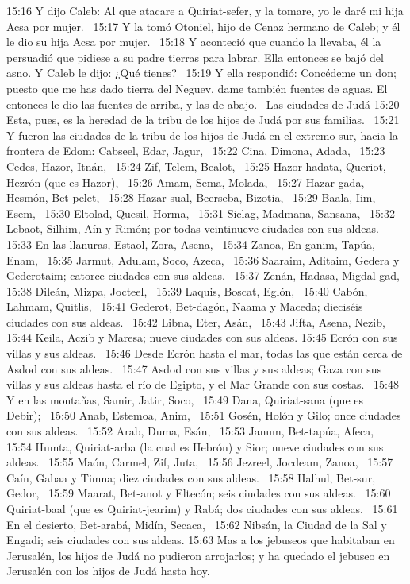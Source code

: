 15:16 Y dijo Caleb: Al que atacare a Quiriat-sefer, y la tomare, yo le daré mi hija Acsa por mujer.  
15:17 Y la tomó Otoniel, hijo de Cenaz hermano de Caleb; y él le dio su hija Acsa por mujer.  
15:18 Y aconteció que cuando la llevaba, él la persuadió que pidiese a su padre tierras para labrar. Ella entonces se bajó del asno. Y Caleb le dijo: ¿Qué tienes?  
15:19 Y ella respondió: Concédeme un don; puesto que me has dado tierra del Neguev, dame también fuentes de aguas. El entonces le dio las fuentes de arriba, y las de abajo.  
Las ciudades de Judá 
15:20 Esta, pues, es la heredad de la tribu de los hijos de Judá por sus familias.  
15:21 Y fueron las ciudades de la tribu de los hijos de Judá en el extremo sur, hacia la frontera de Edom: Cabseel, Edar, Jagur,  
15:22 Cina, Dimona, Adada,  
15:23 Cedes, Hazor, Itnán,  
15:24 Zif, Telem, Bealot,  
15:25 Hazor-hadata, Queriot, Hezrón (que es Hazor),  
15:26 Amam, Sema, Molada,  
15:27 Hazar-gada, Hesmón, Bet-pelet,  
15:28 Hazar-sual, Beerseba, Bizotia,  
15:29 Baala, Iim, Esem,  
15:30 Eltolad, Quesil, Horma,  
15:31 Siclag, Madmana, Sansana,  
15:32 Lebaot, Silhim, Aín y Rimón; por todas veintinueve ciudades con sus aldeas.  
15:33 En las llanuras, Estaol, Zora, Asena,  
15:34 Zanoa, En-ganim, Tapúa, Enam,  
15:35 Jarmut, Adulam, Soco, Azeca,  
15:36 Saaraim, Aditaim, Gedera y Gederotaim; catorce ciudades con sus aldeas.  
15:37 Zenán, Hadasa, Migdal-gad,  
15:38 Dileán, Mizpa, Jocteel,  
15:39 Laquis, Boscat, Eglón,  
15:40 Cabón, Lahmam, Quitlis,  
15:41 Gederot, Bet-dagón, Naama y Maceda; dieciséis ciudades con sus aldeas.  
15:42 Libna, Eter, Asán,  
15:43 Jifta, Asena, Nezib,  
15:44 Keila, Aczib y Maresa; nueve ciudades con sus aldeas. 
15:45 Ecrón con sus villas y sus aldeas.  
15:46 Desde Ecrón hasta el mar, todas las que están cerca de Asdod con sus aldeas.  
15:47 Asdod con sus villas y sus aldeas; Gaza con sus villas y sus aldeas hasta el río de Egipto, y el Mar Grande con sus costas.  
15:48 Y en las montañas, Samir, Jatir, Soco,  
15:49 Dana, Quiriat-sana (que es Debir);  
15:50 Anab, Estemoa, Anim,  
15:51 Gosén, Holón y Gilo; once ciudades con sus aldeas.  
15:52 Arab, Duma, Esán,  
15:53 Janum, Bet-tapúa, Afeca,  
15:54 Humta, Quiriat-arba (la cual es Hebrón) y Sior; nueve ciudades con sus aldeas.  
15:55 Maón, Carmel, Zif, Juta,  
15:56 Jezreel, Jocdeam, Zanoa,  
15:57 Caín, Gabaa y Timna; diez ciudades con sus aldeas.  
15:58 Halhul, Bet-sur, Gedor,  
15:59 Maarat, Bet-anot y Eltecón; seis ciudades con sus aldeas.  
15:60 Quiriat-baal (que es Quiriat-jearim) y Rabá; dos ciudades con sus aldeas.  
15:61 En el desierto, Bet-arabá, Midín, Secaca,  
15:62 Nibsán, la Ciudad de la Sal y Engadi; seis ciudades con sus aldeas. 
15:63 Mas a los jebuseos que habitaban en Jerusalén, los hijos de Judá no pudieron arrojarlos; y ha quedado el jebuseo en Jerusalén con los hijos de Judá hasta hoy. 
